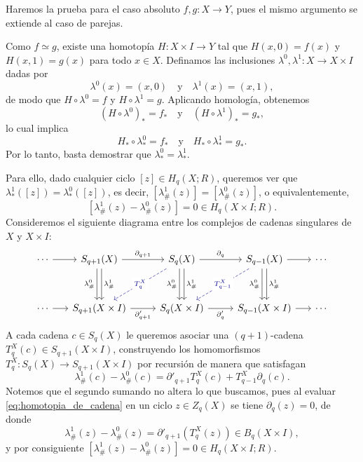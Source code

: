 \begin{dem}
Haremos la prueba para el caso absoluto $f, g \colon X \to Y$, pues el mismo argumento se extiende al caso de parejas.

Como $f \simeq g$, existe una homotopía $H \colon X \times I \to Y$ tal que $H(x, 0) = f(x)$ y $H(x, 1) = g(x)$ para todo $x \in X$. Definamos las inclusiones $\lambda^0, \lambda^1 \colon X \to X \times I$ dadas por
\[
\lambda^0(x) = (x, 0) \quad \text{y} \quad \lambda^1(x) = (x, 1),
\]
de modo que $H \circ \lambda^0 = f$ y $H \circ \lambda^1 = g$. Aplicando homología, obtenemos
\[
(H \circ \lambda^0)_* = f_* \quad \text{y} \quad (H \circ \lambda^1)_* = g_*,
\]
lo cual implica
\[
H_* \circ \lambda^0_* = f_* \quad \text{y} \quad H_* \circ \lambda^1_* = g_*.
\]
Por lo tanto, basta demostrar que $\lambda^0_* = \lambda^1_*$.

Para ello, dado cualquier ciclo $[z] \in H_q(X; R)$, queremos ver que $\lambda^1_*([z]) = \lambda^0_*([z])$, es decir, $[\lambda^1_\#(z)] = [\lambda^0_\#(z)]$, o equivalentemente,
\[
[\lambda^1_\#(z) - \lambda^0_\#(z)] = 0 \in H_q(X \times I; R).
\]
Consideremos el siguiente diagrama entre los complejos de cadenas singulares de $X$ y $X \times I$:
\[
\begin{tikzcd}[column sep=2.6em, row sep=3.2em]
\cdots \arrow[r] &[-1em] S_{q+1}(X) \arrow[r, "\partial_{q+1}"] \arrow[d, shift right=0.55ex, "\lambda^0_\#"'] \arrow[d, shift left=0.55ex, "\lambda^1_\#"] & S_q(X) \arrow[r, "\partial_q"] \arrow[d, shift right=0.55ex, "\lambda^0_\#"'] \arrow[d, shift left=0.55ex, "\lambda^1_\#"] \arrow[dl, dashed, blue!55!black, "T_q^X"{description}] & S_{q-1}(X) \arrow[r] \arrow[d, shift right=0.55ex, "\lambda^0_\#"'] \arrow[d, shift left=0.55ex, "\lambda^1_\#"] \arrow[dl, dashed, blue!55!black, "T_{q-1}^X"{description}] &[-1em] \cdots \\
\cdots \arrow[r] & S_{q+1}(X \times I) \arrow[r, "\partial'_{q+1}"'] & S_q(X \times I) \arrow[r, "\partial'_q"'] & S_{q-1}(X \times I) \arrow[r] & \cdots
\end{tikzcd}
\]
A cada cadena $c \in S_q(X)$ le queremos asociar una $(q+1)$-cadena $T_q^X(c) \in S_{q+1}(X \times I)$, construyendo los homomorfismos $T_q^X \colon S_q(X) \to S_{q+1}(X \times I)$ por recursión de manera que satisfagan
\begin{equation}
\label{eq:homotopia_de_cadena}
\lambda^1_\#(c) - \lambda^0_\#(c) = \partial'_{q+1} T_q^X(c) + T_{q-1}^X \partial_q(c).
\end{equation}
Notemos que el segundo sumando no altera lo que buscamos, pues al evaluar \ref{eq:homotopia_de_cadena} en un ciclo $z \in Z_q(X)$ se tiene $\partial_q(z) = 0$, de donde
\[
\lambda^1_\#(z) - \lambda^0_\#(z) = \partial'_{q+1}(T_q^X(z)) \in B_q(X \times I),
\]
y por consiguiente $[\lambda^1_\#(z) - \lambda^0_\#(z)] = 0 \in H_q(X \times I; R)$.


\end{dem}
